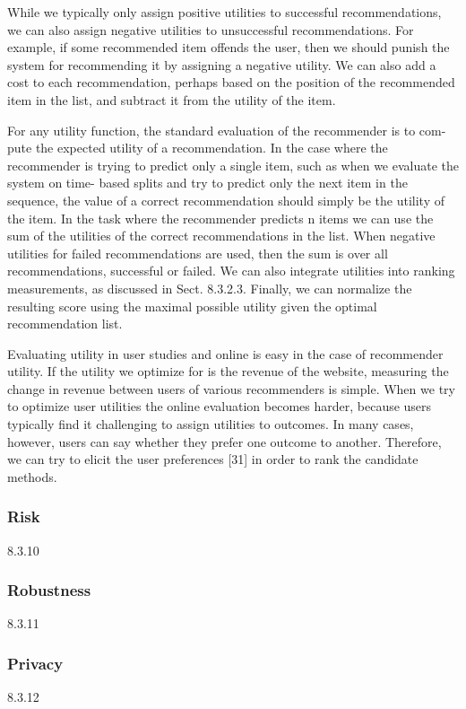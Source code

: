 While we typically only assign positive utilities to successful recommendations, we can also assign negative utilities to unsuccessful recommendations. For example, if some recommended item offends the user, then we should punish the system for recommending it by assigning a negative utility. We can also add a cost to each recommendation, perhaps based on the position of the recommended item in the list, and subtract it from the utility of the item.

For any utility function, the standard evaluation of the recommender is to com- pute the expected utility of a recommendation. In the case where the recommender is trying to predict only a single item, such as when we evaluate the system on time- based splits and try to predict only the next item in the sequence, the value of a correct recommendation should simply be the utility of the item. In the task where the recommender predicts n items we can use the sum of the utilities of the correct recommendations in the list. When negative utilities for failed recommendations are used, then the sum is over all recommendations, successful or failed. We can also integrate utilities into ranking measurements, as discussed in Sect. 8.3.2.3. Finally, we can normalize the resulting score using the maximal possible utility given the optimal recommendation list.

Evaluating utility in user studies and online is easy in the case of recommender utility. If the utility we optimize for is the revenue of the website, measuring the change in revenue between users of various recommenders is simple. When we try to optimize user utilities the online evaluation becomes harder, because users typically find it challenging to assign utilities to outcomes. In many cases, however, users can say whether they prefer one outcome to another. Therefore, we can try to elicit the user preferences [31] in order to rank the candidate methods.

\subsubsection{Risk}
{8.3.10}

\subsubsection{Robustness}
{8.3.11}

\subsubsection{Privacy}
{8.3.12}

